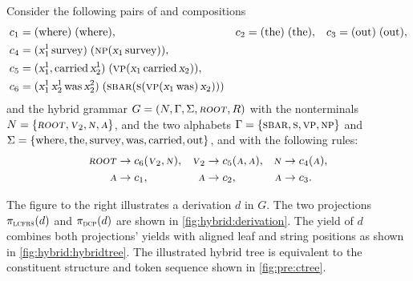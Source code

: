 \documentclass[../../document.tex]{subfiles}
\begin{document}
    \begin{example}\label{ex:hg:derivation}
        Consider the following pairs of  and  compositions
        \begin{align*}
            c_1 &= (\tn{where})\;(\tn{where}),
            &c_2 &= (\tn{the})\;(\tn{the}),
            &c_3 &= (\tn{out})\;(\tn{out}), \\
%
            c_4 &= (\x_1^1\, \tn{survey})\;(\cn{np} (\x_1 \, \tn{survey})), \\
            c_5 &= (\x_1^1, \tn{carried}\,\x_2^1)\;(\cn{vp}(\x_1 \, \tn{carried}\,\x_2)), \\
            c_6 &= (\x_1^1\,\x_2^1\,\tn{was}\,\x_2^2)\;(\cn{sbar} (\cn{s} (\cn{vp} (\x_1\, \tn{was})\,\x_2)))
        \end{align*}
        and the hybrid grammar \(G= (N, \Gamma, \Sigma, \textsc{\textsl{root}}, R)\) with the nonterminals \(N = \{\textsc{\textsl{root}}, \textsc{\textsl{v}}_2, \textsc{\textsl{n}}, \textsc{\textsl{a}}\}\), and the two alphabets \(\Gamma = \{\textsc{sbar}, \textsc{s}, \textsc{vp}, \textsc{np}\}\) and \(\Sigma = \{\text{where}, \text{the}, \text{survey}, \text{was}, \text{carried}, \text{out}\}\), and with the following rules:
        \begin{align*}
            \textsc{\textsl{root}} &\to c_6 (\textsc{\textsl{v}}_2, \textsc{\textsl{n}}), & \textsc{\textsl{v}}_2 &\to c_5 (\textsc{\textsl{a}}, \textsc{\textsl{a}}), & \textsc{\textsl{n}} &\to c_4 (\textsc{\textsl{a}}), \\
            \textsc{\textsl{a}} &\to c_1, & \textsc{\textsl{a}} &\to c_2, & \textsc{\textsl{a}} &\to c_3 \text{.}
        \end{align*}

        \noindent
        \begin{minipage}[b]{.63\linewidth}
            The figure to the right illustrates a derivation \(d\) in \(G\).
            The two projections \(\pi_{\textsc{lcfrs}}(d)\) and \(\pi_{\textsc{dcp}}(d)\) are shown in \cref{fig:hybrid:derivation}.
            The yield of \(d\) combines both projections' yields with aligned leaf and string positions as shown in \cref{fig:hybrid:hybridtree}.
            The illustrated hybrid tree is equivalent to the constituent structure and token sequence shown in \cref{fig:pre:ctree}.
        \end{minipage}
        \hfill
    \end{example}
\end{document}
